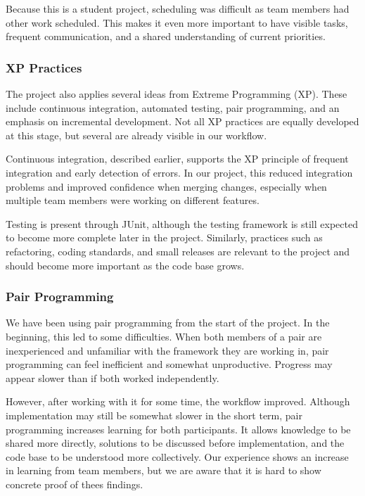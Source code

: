 Because this is a student project, scheduling was difficult as team members had other work scheduled.
This makes it even more important to have visible tasks, frequent communication, and a shared understanding of current priorities. 

\subsubsection{XP Practices}

The project also applies several ideas from Extreme Programming (XP).
These include continuous integration, automated testing, pair programming, and an emphasis on incremental development.
Not all XP practices are equally developed at this stage, but several are already visible in our workflow.


Continuous integration, described earlier, supports the XP principle of frequent integration
and early detection of errors.
In our project, this reduced integration problems and improved confidence when merging changes,
especially when multiple team members were working on different features.

Testing is present through JUnit, although the testing framework is still expected to become more complete later in the project.
Similarly, practices such as refactoring, coding standards, and small releases are relevant to the project
and should become more important as the code base grows. 


\subsubsection{Pair Programming}

We have been using pair programming from the start of the project.
In the beginning, this led to some difficulties.
When both members of a pair are inexperienced and unfamiliar with the framework they are working in,
pair programming can feel inefficient and somewhat unproductive.
Progress may appear slower than if both worked independently.

However, after working with it for some time, the workflow improved.
Although implementation may still be somewhat slower in the short term,
pair programming increases learning for both participants.
It allows knowledge to be shared more directly, solutions to be discussed before implementation,
and the code base to be understood more collectively.
Our experience shows an increase in learning from team members,
but we are aware that it is hard to show concrete proof of thees findings.

